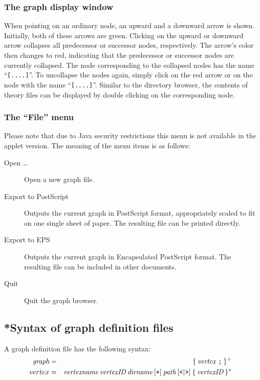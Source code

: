 \subsubsection*{The graph display window}

When pointing on an ordinary node, an upward and a downward arrow is
shown.  Initially, both of these arrows are green. Clicking on the
upward or downward arrow collapses all predecessor or successor nodes,
respectively. The arrow's color then changes to red, indicating that
the predecessor or successor nodes are currently collapsed. The node
corresponding to the collapsed nodes has the name ``{\tt [....]}''. To
uncollapse the nodes again, simply click on the red arrow or on the
node with the name ``{\tt [....]}''. Similar to the directory browser,
the contents of theory files can be displayed by double clicking on
the corresponding node.


\subsubsection*{The ``File'' menu}

Please note that due to Java security restrictions this menu is not
available in the applet version. The meaning of the menu items is as
follows:
\begin{description}
  
\item[Open \dots] Open a new graph file.
  
\item[Export to PostScript] Outputs the current graph in {\sc
    PostScript} format, appropriately scaled to fit on one single
  sheet of paper.  The resulting file can be printed directly.
  
\item[Export to EPS] Outputs the current graph in Encapsulated {\sc
    PostScript} format. The resulting file can be included in other
  documents.

\item[Quit] Quit the graph browser.

\end{description}


\subsection*{*Syntax of graph definition files}

A graph definition file has the following syntax:
\begin{eqnarray*}
  \mbox{\it graph} & = & \{ \: \mbox{\it vertex \tt ;} \: \} ^ + \\
  vertex & = & \mbox{\it vertexname} \: \mbox{\it vertexID} \: \mbox{\it dirname} \: [ \mbox{\tt +} ]
  \: \mbox{\it path} \: [ \mbox{\tt <} | \mbox{\tt >} ] \: \{ \: \mbox{\it vertexID} \: \} ^ *
\end{eqnarray*}

